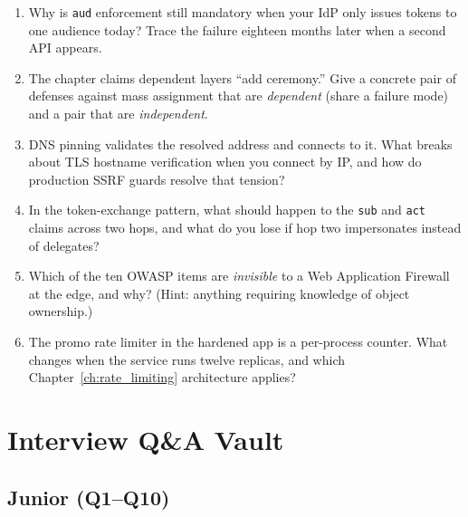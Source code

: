 \begin{enumerate}[label=\textbf{D16.\arabic*.}, leftmargin=1.9cm, itemsep=0.4em]
  \item Why is \texttt{aud} enforcement still mandatory when your IdP only
        issues tokens to one audience today? Trace the failure eighteen
        months later when a second API appears.
  \item The chapter claims dependent layers ``add ceremony.'' Give a
        concrete pair of defenses against mass assignment that are
        \emph{dependent} (share a failure mode) and a pair that are
        \emph{independent}.
  \item DNS pinning validates the resolved address and connects to it.
        What breaks about TLS hostname verification when you connect by IP,
        and how do production SSRF guards resolve that tension?
  \item In the token-exchange pattern, what should happen to the
        \texttt{sub} and \texttt{act} claims across two hops, and what do
        you lose if hop two impersonates instead of delegates?
  \item Which of the ten OWASP items are \emph{invisible} to a Web
        Application Firewall at the edge, and why? (Hint: anything
        requiring knowledge of object ownership.)
  \item The promo rate limiter in the hardened app is a per-process
        counter. What changes when the service runs twelve replicas, and
        which Chapter~\ref{ch:rate_limiting} architecture applies?
\end{enumerate}

\section{Interview Q\&A Vault}
\label{sec:ch16-interviews}

\subsection*{Junior (Q1--Q10)}

